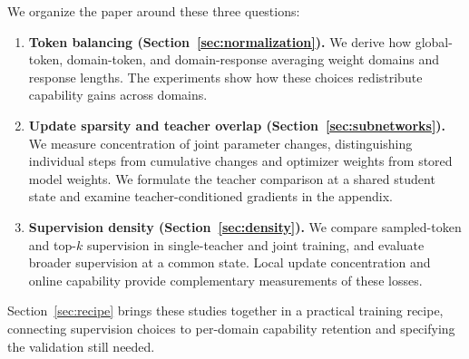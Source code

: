 We organize the paper around these three questions:
\begin{enumerate}
\item \textbf{Token balancing (Section~\ref{sec:normalization}).}
We derive how global-token, domain-token, and domain-response averaging weight domains and response lengths. The experiments show how these choices redistribute capability gains across domains.
\item \textbf{Update sparsity and teacher overlap (Section~\ref{sec:subnetworks}).}
We measure concentration of joint parameter changes, distinguishing individual steps from cumulative changes and optimizer weights from stored model weights. We formulate the teacher comparison at a shared student state and examine teacher-conditioned gradients in the appendix.
\item \textbf{Supervision density (Section~\ref{sec:density}).}
We compare sampled-token and top-$k$ supervision in single-teacher and joint training, and evaluate broader supervision at a common state. Local update concentration and online capability provide complementary measurements of these losses.
\end{enumerate}

Section~\ref{sec:recipe} brings these studies together in a practical training recipe, connecting supervision choices to per-domain capability retention and specifying the validation still needed.
